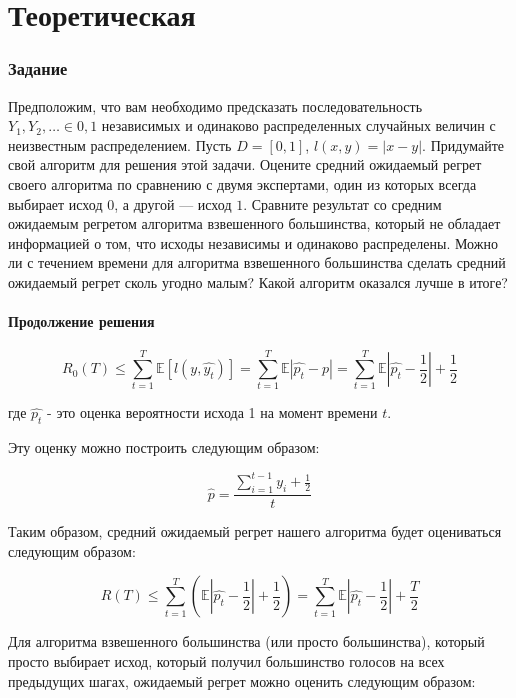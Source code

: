 \documentclass[a4paper,14pt]{extarticle}
\begin{document}
\newpage

\part{Теоретическая}
\section{Задание }

Предположим, что вам необходимо предсказать последовательность $Y_1, Y_2, \ldots \in {0, 1}$ независимых и одинаково распределенных случайных величин с неизвестным распределением. Пусть $D = [0, 1]$, $l(x, y) = |x - y|$. Придумайте свой алгоритм для решения этой задачи. Оцените средний ожидаемый регрет своего алгоритма по сравнению с двумя экспертами, один из которых всегда выбирает исход $0$, а другой — исход $1$. Сравните результат со средним ожидаемым регретом алгоритма взвешенного большинства, который не обладает информацией о том, что исходы независимы и одинаково распределены. Можно ли с течением времени для алгоритма взвешенного большинства сделать средний ожидаемый регрет сколь угодно малым? Какой алгоритм оказался лучше в итоге?

\subsection{Продолжение решения}

$$R_0(T) \le \sum_{t=1}^{T}\mathbb{E}\left[l\left(y, \hat{y_t}\right)\right] = \sum_{t=1}^{T}\mathbb{E}\left|\hat{p_t} - p\right| = \sum_{t=1}^{T}\mathbb{E}\left|\hat{p_t} - \frac{1}{2}\right| + \frac{1}{2}$$

где $\hat{p_t}$ - это оценка вероятности исхода 1 на момент времени $t$.

Эту оценку можно построить следующим образом:

$$\hat{p} = \frac{\sum_{i = 1}^{t - 1} y_i + \frac{1}{2}}{t}$$

Таким образом, средний ожидаемый регрет нашего алгоритма будет оцениваться следующим образом:

$$R(T) \leq \sum_{t=1}^T \left(\mathbb{E}\left|\hat{p_t}-\frac{1}{2}\right| + \frac{1}{2}\right) = \sum_{t=1}^T \mathbb{E}\left|\hat{p_t}-\frac{1}{2}\right| + \frac{T}{2}$$

Для алгоритма взвешенного большинства (или просто большинства), который просто выбирает исход, который получил большинство голосов на всех предыдущих шагах, ожидаемый регрет можно оценить следующим образом:
\end{document}
